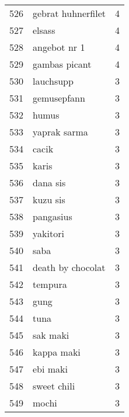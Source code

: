 \begin{tabular}{llr}
526  &                                 gebrat huhnerfilet &      4 \\
527  &                                             elsass &      4 \\
528  &                                       angebot nr 1 &      4 \\
529  &                                      gambas picant &      4 \\
530  &                                          lauchsupp &      3 \\
531  &                                        gemusepfann &      3 \\
532  &                                              humus &      3 \\
533  &                                       yaprak sarma &      3 \\
534  &                                              cacik &      3 \\
535  &                                              karis &      3 \\
536  &                                           dana sis &      3 \\
537  &                                           kuzu sis &      3 \\
538  &                                          pangasius &      3 \\
539  &                                           yakitori &      3 \\
540  &                                               saba &      3 \\
541  &                                  death by chocolat &      3 \\
542  &                                            tempura &      3 \\
543  &                                               gung &      3 \\
544  &                                               tuna &      3 \\
545  &                                           sak maki &      3 \\
546  &                                         kappa maki &      3 \\
547  &                                           ebi maki &      3 \\
548  &                                        sweet chili &      3 \\
549  &                                              mochi &      3 \\

\end{tabular}
